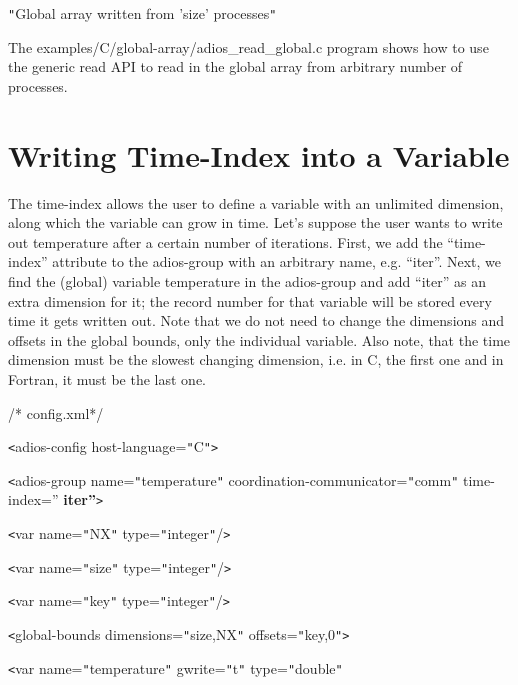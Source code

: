 \parindent=0pt
\texttt{"}Global array written from 'size' processes\texttt{"}

The examples/C/global-array/adios\_read\_global.c program shows how to use the 
generic read API to read in the global array from arbitrary number of processes. 
\label{HToc84890303}\label{HToc212016678}\label{HToc212016920}\label{HToc182553450}

\section{Writing Time-Index into a Variable}

The time-index allows the user to define a variable with an unlimited dimension, 
along which the variable can grow in time. Let's suppose the user wants to write 
out temperature after a certain number of iterations. First, we add the ``time-index'' 
attribute to the adios-group with an arbitrary name, e.g. ``iter''. Next, we find 
the (global) variable temperature in the adios-group and add ``iter'' as an extra 
dimension for it; the record number for that variable will be stored every time 
it gets written out. Note that we do not need to change the dimensions and offsets 
in the global bounds, only the individual variable. Also note, that the time dimension 
must be the slowest changing dimension, i.e. in C, the first one and in Fortran, 
it must be the last one.

/* config.xml*/

\texttt{<}adios-config host-language=\texttt{"}C\texttt{"}\texttt{>}

\parindent=14pt
\texttt{<}adios-group name=\texttt{"}temperature\texttt{"} coordination-communicator=\texttt{"}comm\texttt{"} 
time-index=''{\color{color02} \textbf{iter''}}\texttt{>}

\parindent=28pt
\texttt{<}var name=\texttt{"}NX\texttt{"} type=\texttt{"}integer\texttt{"}/\texttt{>}

\texttt{<}var name=\texttt{"}size\texttt{"} type=\texttt{"}integer\texttt{"}/\texttt{>}

\parindent=57pt
\texttt{<}var name=\texttt{"}key\texttt{"} type=\texttt{"}integer\texttt{"}/\texttt{>}

\parindent=0pt
{\color{color02} \texttt{<}global-bounds dimensions=\texttt{"}size,NX\texttt{"} 
offsets=\texttt{"}key,0\texttt{"}\texttt{>}}

{\color{color02} \texttt{<}var name=\texttt{"}temperature\texttt{"} gwrite=\texttt{"}t\texttt{"} 
type=\texttt{"}double\texttt{"} }

